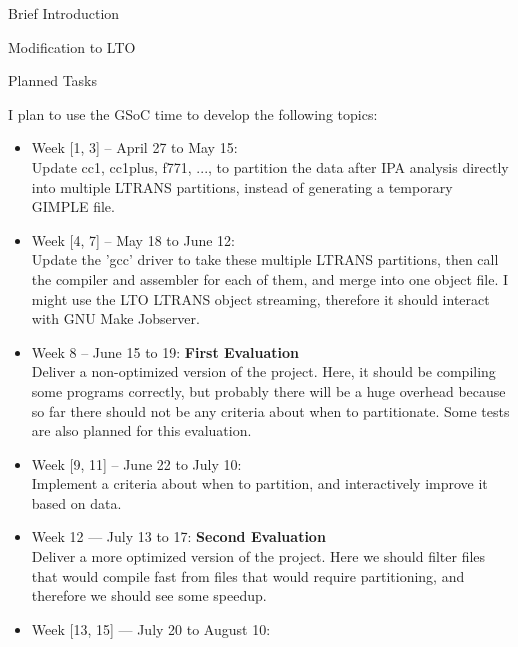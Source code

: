 \documentclass[12pt]{article}
\begin{document}
\begin{section}{Brief Introduction}
\begin{subsection}{Modification to LTO}
\begin{itemize}
\end{itemize}

\end{subsection}

\begin{subsection}{Planned Tasks}

I plan to use the GSoC time to develop the following topics:

\begin{itemize}
 \item{Week [1, 3] -- April 27 to May 15:} \\

  Update cc1, cc1plus, f771, ..., to partition the data after IPA
  analysis directly into multiple LTRANS partitions, instead of
  generating a temporary GIMPLE file.


 \item{Week [4, 7] -- May 18 to June 12:} \\

  Update the 'gcc' driver to take these multiple LTRANS partitions,
  then call the compiler and assembler for each of them, and merge into
  one object file. I might use the LTO LTRANS object streaming, therefore
  it should interact with GNU Make Jobserver.

 \item{Week 8 -- June 15 to 19:} \textbf{First Evaluation} \\

  Deliver a non-optimized version of the project. Here, it should
  be compiling some programs correctly, but probably there will be
  a huge overhead because so far there should not be any criteria
  about when to partitionate. Some tests are also planned for this
  evaluation.

 \item{Week [9, 11] -- June 22 to July 10:} \\

  Implement a criteria about when to partition, and interactively
  improve it based on data.

 \item{Week 12 --- July 13 to 17:} \textbf{Second Evaluation} \\

  Deliver a more optimized version of the project. Here we should
  filter files that would compile fast from files that would require
  partitioning, and therefore we should see some speedup.

\item{Week [13, 15] --- July 20 to August 10:} \\


\end{itemize}
\end{subsection}
\end{section}
\end{document}
